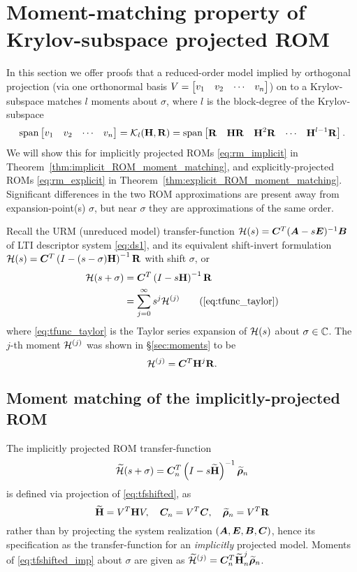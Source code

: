 \section{Moment-matching property of Krylov-subspace  projected ROM}\label{sec:moment_matching_proofs}
In this section we offer proofs that a reduced-order model implied by orthogonal  projection (via one orthonormal basis $V=\begin{bmatrix} v_1&v_2&\cdots&v_n\end{bmatrix}$) on to a Krylov-subspace  matches $l$ moments about $\sigma$, where $l$ is the block-degree of the Krylov-subspace  
\[
\operatorname*{span}\begin{bmatrix} v_1&v_2&\cdots&v_n\end{bmatrix} = \mathcal{K}_{l}({\textbf{\textup{H}}},{\textbf{\textup{R}}}) 
= \operatorname*{span}\begin{bmatrix} \textbf{\textup{R}} & \textbf{\textup{H}}\textbf{\textup{R}} & \textbf{\textup{H}}^2\textbf{\textup{R}} & \cdots & \textbf{\textup{H}}^{l-1} \textbf{\textup{R}}\end{bmatrix}.
\] 
 We will show this for implicitly projected ROMs \eqref{eq:rm_implicit} in Theorem~\ref{thm:implicit_ROM_moment_matching}, and explicitly-projected ROMs \eqref{eq:rm_explicit} in Theorem~\ref{thm:explicit_ROM_moment_matching}.   Significant differences in the two ROM approximations are present away from expansion-point(s) $\sigma$, but near $\sigma$ they are approximations of the same order.
\medskip

Recall the URM (unreduced model) transfer-function $\mathcal{H}(s)=\bm{C}^T(\bm{A}-s \bm{E})^{-1} \bm{B}$ of LTI descriptor system \eqref{eq:ds1}, and its equivalent shift-invert formulation 
$\mathcal{H}(s)=\bm{C}^T\left(I-(s-\sigma)\textbf{\textup{H}}\right)^{-1}\textbf{\textup{R}}$ with shift $\sigma$, or 
\begin{align}
\tf(s+\sigma)&=\CC^T\left(I-s\H\right)^{-1}\RR \label{eq:tfshifted}\\
&= \sum_{j=0}^\infty s^j \mo{j}\tag{\ref{eq:tfunc_taylor}}
\end{align}
        where \eqref{eq:tfunc_taylor} is the Taylor series expansion of $\mathcal{H}(s)$ about $\sigma\in\mathbb{C}$.  The $j$-th moment $\mathcal{H}^{(j)}$ was shown in \S\ref{sec:moments} to be
\begin{equation}
\mathcal{H}^{(j)} =\bm{C}^T \textbf{\textup{H}}^j \textbf{\textup{R}}.
\end{equation}

\subsection{Moment matching of the implicitly-projected ROM}
The implicitly projected ROM transfer-function  
\begin{equation}
\widetilde{\mathcal{H}}(s+\sigma) =\bm{C}_n^T\left(I-s\widetilde{\textbf{\textup{H}}}\right)^{-1}\widetilde{\boldsymbol{\rho}}_n
\label{eq:tfshifted_imp}
\end{equation}
is defined via projection of \eqref{eq:tfshifted}, as
\begin{equation}
\widetilde{\textbf{\textup{H}}} = V^T \textbf{\textup{H}} V, \quad \bm{C}_n = V^T \bm{C}, \quad \widetilde{\boldsymbol{\rho}}_n = V^T \textbf{\textup{R}}
\label{eq:imp_projections}
\end{equation}
rather than by projecting the system realization $(\bm{A},\bm{E},\bm{B},\bm{C})$, hence its specification as the transfer-function for an \emph{implicitly} projected model. Moments of \eqref{eq:tfshifted_imp} about $\sigma$ are given as $\widetilde{\mathcal{H}}^{(j)} = \bm{C}_n^T \widetilde{\textbf{\textup{H}}}^j_n \widetilde{\boldsymbol{\rho}}_n$.

